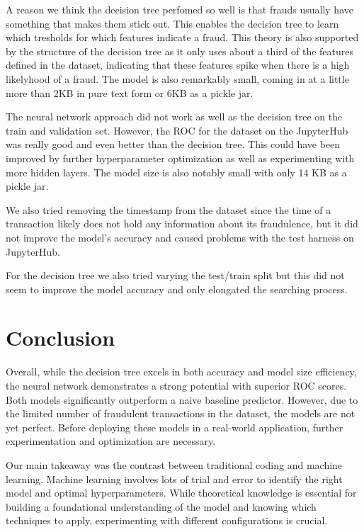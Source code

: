 \documentclass[a4paper, 10pt, conference]{ieeeconf}      %
\begin{document}
A reason we think the decision tree perfomed so well is that frauds usually have something that makes them stick out. 
This enables the decision tree to learn which tresholds for which features indicate a fraud. 
This theory is also supported by the structure of the decision tree as it only uses about a third of the features defined in the dataset, indicating that these features spike when there is a high likelyhood of a fraud.
The model is also remarkably small, coming in at a little more than 2KB in pure text form or 6KB as a pickle jar.

The neural network approach did not work as well as the decision tree on the train and validation set. However, the ROC for the dataset on the JupyterHub was really good and even better than the decision tree.
This could have been improved by further hyperparameter optimization as well as experimenting with more hidden layers. The model size is also notably small with only 14 KB as a pickle jar. 


We also tried removing the timestamp from the dataset since the time of a transaction likely does not hold any information about its fraudulence, but it did not improve the model's accuracy and caused problems with the test harness on JupyterHub.

For the decision tree we also tried varying the test/train split but this did not seem to improve the model accuracy and only elongated the searching process.

\section{Conclusion}
\label{sec:con}
Overall, while the decision tree excels in both accuracy and model size efficiency, the neural network demonstrates a strong potential with superior ROC scores.
Both models significantly outperform a naive baseline predictor. However, due to the limited number of fraudulent transactions in the dataset, the models are not yet perfect. 
Before deploying these models in a real-world application, further experimentation and optimization are necessary.

Our main takeaway was the contrast between traditional coding and machine learning. 
Machine learning involves lots of trial and error to identify the right model and optimal hyperparameters. 
While theoretical knowledge is essential for building a foundational understanding of the model and knowing which techniques to apply, 
experimenting with different configurations is crucial.

\end{document}
